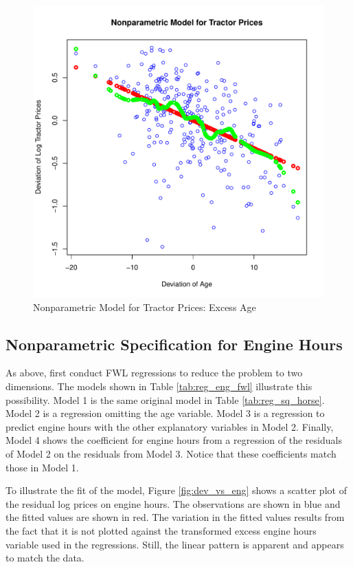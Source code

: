 \documentclass[11pt]{paper}
\begin{document}
\begin{figure}[h!]
  \centering
  \includegraphics[scale = 0.5, keepaspectratio=true]{../Figures/dev_np_vs_age_dev}
  \caption{Nonparametric Model for Tractor Prices: Excess Age} \label{fig:dev_np_vs_age_dev}
\end{figure}





\clearpage
\subsection{Nonparametric Specification for Engine Hours}

As above, first conduct FWL regressions 
to reduce the problem to two dimensions. 
The models shown in
Table \ref{tab:reg_eng_fwl}
illustrate this possibility. 
Model 1 is the same original model in 
Table \ref{tab:reg_sq_horse}. 
Model 2 is a regression omitting the age variable. 
Model 3 is a regression to predict engine hours with the other explanatory variables in Model 2.
Finally, Model 4 shows the coefficient for engine hours
from a regression of the residuals of Model 2
on the residuals from Model 3. 
Notice that these coefficients match those in Model 1. 



\pagebreak 
To illustrate the fit of the model, 
Figure \ref{fig:dev_vs_eng} shows a scatter plot 
of the residual log prices on engine hours. 
The observations are shown in blue
and the fitted values are shown in red.
The variation in the fitted values results from the 
fact that it is not plotted against the transformed excess engine hours variable used in the regressions.
Still, the linear pattern is apparent
and appears to match the data. 
\end{document}

